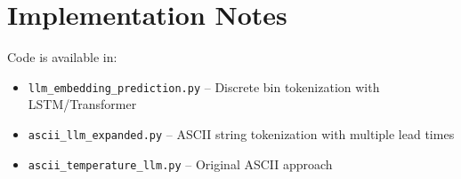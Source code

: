 \documentclass[11pt]{article}
\begin{document}
\section{Implementation Notes}

Code is available in:
\begin{itemize}
    \item \texttt{llm\_embedding\_prediction.py} -- Discrete bin tokenization with LSTM/Transformer
    \item \texttt{ascii\_llm\_expanded.py} -- ASCII string tokenization with multiple lead times
    \item \texttt{ascii\_temperature\_llm.py} -- Original ASCII approach
\end{itemize}
\end{document}
